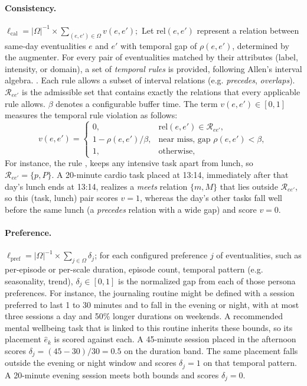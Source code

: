 \documentclass[runningheads]{llncs}
\begin{document}
\paragraph{Consistency.} $\ell_{\mathrm{cal}} = |\Omega|^{-1}\times\sum_{(e,e')\in\Omega} v(e,e');$ Let $\mathrm{rel}(e,e')$ represent a relation between same-day eventualities $e$ and $e'$ with temporal gap of $\rho(e,e')$, determined by the augmenter. For every pair of eventualities matched by their attributes (label, intensity, or domain), a set of \textit{temporal rules} is provided, following Allen's interval algebra.
\citep{Allen}. Each rule 
allows a subset of interval relations (e.g. \textit{precedes}, \textit{overlaps}). $\mathcal{R}_{ee'}$ is the admissible set that contains exactly the relations that every applicable rule allows. $\beta$ denotes a configurable buffer time. The term $v(e,e')\in[0,1]$ measures the temporal rule violation as follows:
\begin{equation}
v(e,e')=
\begin{cases}
0, & \mathrm{rel}(e,e')\in\mathcal{R}_{ee'},\\
1-\rho(e,e')/\beta, & \text{near miss, gap }\rho(e,e')<\beta,\\
1, & \text{otherwise,}
\end{cases}
\label{eq:cab}
\end{equation}
For instance, the rule ,  keeps any intensive task apart from lunch, so $\mathcal{R}_{ee'}=\{p,P\}$. A 20-minute cardio task placed at 13:14, immediately after that day's lunch ends at 13:14, realizes a \textit{meets} relation $\{m,M\}$ that lies outside $\mathcal{R}_{ee'}$, so this (task, lunch) pair scores $v=1$, whereas the day's other tasks fall well before the same lunch (a \textit{precedes} relation with a wide gap) and score $v=0$.


\paragraph{Preference.} $\ell_{\mathrm{pref}} = |\Omega|^{-1}\times\sum_{j\in\Omega} \delta_j$; for each configured preference $j$ of eventualities, such as per-episode or per-scale duration, episode count, temporal pattern (e.g. seasonality, trend), $\delta_j\in[0,1]$ is the normalized gap from each of those persona preferences. For instance, the journaling routine might be defined with a session preferred to last 1 to 30 minutes and to fall in the evening or night, with at most three sessions a day and 50\% longer durations on weekends. A recommended mental wellbeing task that is linked to this routine inherits these bounds, so its placement $\hat{e}_k$ is scored against each. A 45-minute session placed in the afternoon  scores $\delta_j=(45-30)/30=0.5$ on the duration band. The same placement falls outside the evening or night window and scores $\delta_j=1$ on that temporal pattern. A 20-minute evening session meets both bounds and scores $\delta_j=0$.
\end{document}
